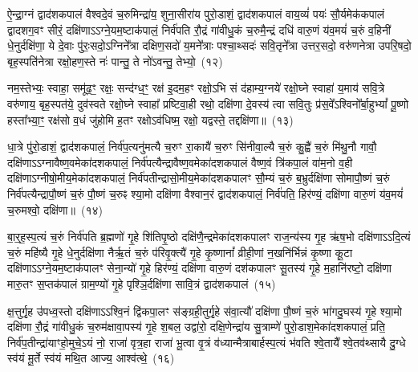 {\anuvakamend[{सुभे॑षजमिहि॒ त्रीणि॑ च}]}%

ऐ॒न्द्रा॒ग्नं द्वाद॑श\-कपालं वैश्वदे॒वं च॒रुमिन्द्रा॑य॒ शुना॒सीरा॑य पुरो॒डाशं॒ द्वाद॑श\-कपालं वाय॒व्यं॑ पयः॑ सौ॒र्यमेक॑कपालं द्वादशग॒वꣳ सीरं॒ दक्षि॑णा\-ऽऽ\-ग्ने॒यम॒ष्टा\-क॑पालं॒ निर्व॑पति रौ॒द्रं गा॑वीधु॒कं च॒रुमै॒न्द्रं दधि॑ वारु॒णं य॑व॒मयं॑ च॒रुं व॒हिनी॑ धे॒नुर्दक्षि॑णा॒ ये दे॒वाः पु॑रः॒सदो॒\-ऽग्निने᳚त्रा दक्षिण॒सदो॑ य॒मने᳚त्राः पश्चा॒थ्सदः॑ सवि॒तृने᳚त्रा उत्तर॒सदो॒ वरु॑णनेत्रा उपरि॒षदो॒ बृह॒स्पति॑नेत्रा रक्षो॒हण॒स्ते नः॑ पान्तु॒ ते नो॑\-ऽवन्तु॒ तेभ्यो॒~(१२)

नम॒स्तेभ्यः॒ स्वाहा॒ समू॑ढ॒ꣳ॒ रक्षः॒ सन्द॑ग्ध॒ꣳ॒ रक्ष॑ इ॒दम॒हꣳ रक्षो॒\-ऽभि सं द॑हाम्य॒ग्नये॑ रक्षो॒घ्ने स्वाहा॑ य॒माय॑ सवि॒त्रे वरु॑णाय॒ बृह॒स्पत॑ये॒ दुव॑स्वते रक्षो॒घ्ने स्वाहा᳚ प्रष्टिवा॒ही रथो॒ दक्षि॑णा दे॒वस्य॑ त्वा सवि॒तुः प्र॑स॒वे᳚\-ऽश्विनो᳚र्बा॒हु\-भ्यां᳚ पू॒ष्णो हस्ता᳚भ्या॒ꣳ॒ रक्ष॑सो व॒धं जु॑होमि ह॒तꣳ रक्षो\-ऽव॑धिष्म॒ रक्षो॒ यद्वस्ते॒ तद्दक्षि॑णा॥~(१३)


{\anuvakamend[{तेभ्यः॒ पञ्च॑चत्वारिꣳशच्च}]}%

धा॒त्रे पु॑रो॒डाशं॒ द्वाद॑श\-कपालं॒ निर्व॑प॒त्यनु॑मत्यै च॒रुꣳ रा॒कायै॑ च॒रुꣳ सि॑नीवा॒ल्यै च॒रुं कु॒ह्वै॑ च॒रुं मि॑थु॒नौ गावौ॒ दक्षि॑णा\-ऽऽ\-ग्नावैष्ण॒वमेका॑\-दश\-कपालं॒ निर्व॑पत्यैन्द्रावैष्ण॒वमेका॑\-दश\-कपालं वैष्ण॒वं त्रि॑कपा॒लं वा॑म॒नो व॒ही दक्षि॑णा\-ऽग्नीषो॒मीय॒मेका॑\-दश\-कपालं॒ निर्व॑पतीन्द्रा\-सो॒मीय॒\-मेका॑\-दश\-कपालꣳ सौ॒म्यं च॒रुं ब॒भ्रुर्दक्षि॑णा सोमापौ॒ष्णं च॒रुं निर्व॑पत्यैन्द्रापौ॒ष्णं च॒रुं पौ॒ष्णं च॒रुꣴ श्या॒मो दक्षि॑णा वैश्वान॒रं द्वाद॑श\-कपालं॒ निर्व॑पति॒ हिर॑ण्यं॒ दक्षि॑णा वारु॒णं य॑व॒मयं॑ च॒रुमश्वो॒ दक्षि॑णा॥~(१४)

{\anuvakamend[{निर॒ष्टौ च}]}%

बा॒र्॒\mbox{}ह॒स्प॒त्यं च॒रुं निर्व॑पति ब्र॒ह्मणो॑ गृ॒हे शि॑तिपृ॒ष्ठो दक्षि॑णै॒न्द्रमेका॑\-दश\-कपालꣳ राज॒न्य॑स्य गृ॒ह ऋ॑ष॒भो दक्षि॑णा\-ऽऽ\-दि॒त्यं च॒रुं महि॑ष्यै गृ॒हे धे॒नुर्दक्षि॑णा नैर्\mbox{}ऋ॒तं च॒रुं प॑रिवृ॒क्त्यै॑ गृ॒हे कृ॒ष्णानां᳚ व्रीही॒णां न॒खनि॑र्भिन्नं कृ॒ष्णा कू॒टा दक्षि॑णा\-ऽऽ\-ग्ने॒यम॒ष्टाक॑पालꣳ सेना॒न्यो॑ गृ॒हे हिर॑ण्यं॒ दक्षि॑णा वारु॒णं दश॑\-कपालꣳ सू॒तस्य॑ गृ॒हे म॒हानि॑रष्टो॒ दक्षि॑णा मारु॒तꣳ स॒प्तक॑पालं ग्राम॒ण्यो॑ गृ॒हे पृश्ञि॒र्दक्षि॑णा सावि॒त्रं द्वाद॑श\-कपालं~(१५)

क्ष॒त्तुर्गृ॒ह उ॑पध्व॒स्तो दक्षि॑णा\-ऽऽ\-श्वि॒नं द्वि॑कपा॒लꣳ स॑ङ्ग्रही॒तुर्गृ॒हे स॑वा॒त्यौ॑ दक्षि॑णा पौ॒ष्णं च॒रुं भा॑गदु॒घस्य॑ गृ॒हे श्या॒मो दक्षि॑णा रौ॒द्रं गा॑वीधु॒कं च॒रुम॑क्षावा॒पस्य॑ गृ॒हे श॒बल॒ उद्वा॑रो॒ दक्षि॒णेन्द्रा॑य सु॒त्राम्णे॑ पुरो॒डाश॒मेका॑\-दश\-कपालं॒ प्रति॒ निर्व॑प॒तीन्द्रा॑याꣳहो॒मुचे॒\-ऽयं नो॒ राजा॑ वृत्र॒हा राजा॑ भू॒त्वा वृ॒त्रं व॑ध्यान्मैत्राबार्\mbox{}हस्प॒त्यं भ॑वति श्वे॒तायै᳚ श्वे॒तव॑थ्सायै दु॒ग्धे स्व॑यं मू॒र्ते स्व॑यं मथि॒त आज्य॒ आश्व॑त्थे॒~(१६)

